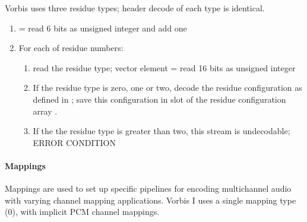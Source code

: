 Vorbis uses three residue types; header decode of each type is identical.


\begin{enumerate}
\item {} = read 6 bits as unsigned integer and add one

\item For each of  residue numbers:
 \begin{enumerate}
  \item read the residue type; vector  element \varname{[i]} = read 16 bits as unsigned integer
  \item If the residue type is zero,
one or two, decode the residue configuration as defined in ; save this configuration in slot \varname{[i]} of the residue configuration array .
  \item If the the residue type is greater than two, this stream is undecodable; ERROR CONDITION
 \end{enumerate}

\end{enumerate}



\paragraph{Mappings}

Mappings are used to set up specific pipelines for encoding
multichannel audio with varying channel mapping applications. Vorbis I
uses a single mapping type (0), with implicit PCM channel mappings.

